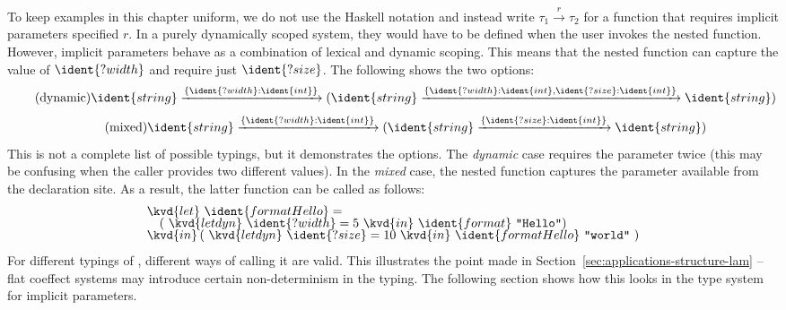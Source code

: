To keep examples in this chapter uniform, we do not use the Haskell notation and instead
write $\tau_1 \xrightarrow{r} \tau_2$ for a function that requires implicit parameters specified $r$.
In a purely dynamically scoped system, they would have to be defined when the user invokes the nested function.
However, implicit parameters behave as a combination of lexical and dynamic scoping. This means
that the nested function can capture the value of $\ident{?width}$ and require just $\ident{?size}$.
The following shows the two options:
%
\begin{equation}
\tag{dynamic}
\ident{string} \xrightarrow{ \{ \ident{?width} : \ident{int} \} }
  (\ident{string} \xrightarrow{ \{ \ident{?width} : \ident{int}, \ident{?size} : \ident{int} \} } \ident{string})
\end{equation}
\vspace{-1em}
\begin{equation}
\tag{mixed}
\ident{string} \xrightarrow{ \{ \ident{?width} : \ident{int} \} }
  (\ident{string} \xrightarrow{ \{ \ident{?size} : \ident{int} \} } \ident{string})
\end{equation}
%
This is not a complete list of possible typings, but it demonstrates the options. The \emph{dynamic}
case requires the parameter  twice (this may be confusing when the caller provides
two different values). In the \emph{mixed} case, the nested function captures the  
parameter available from the declaration site. As a result, the latter function can be called as follows:\
%
\begin{equation*}
\begin{array}{l}
\kvd{let}~\ident{formatHello} = \\[-0.25em]
\quad(~\kvd{letdyn}~\ident{?width}=5~\kvd{in}~\ident{format}~\texttt{"Hello"})\\[-0.25em]
\kvd{in}\,(~\kvd{letdyn}~\ident{?size} = 10~\kvd{in}~\ident{formatHello}~\texttt{"world"}~)
\end{array}
\end{equation*}
%
For different typings of , different ways of calling it are valid. This illustrates
the point made in Section~\ref{sec:applications-structure-lam} -- flat coeffect systems may 
introduce certain non-determinism in the typing. The following section shows how this looks in the
type system for implicit parameters.


